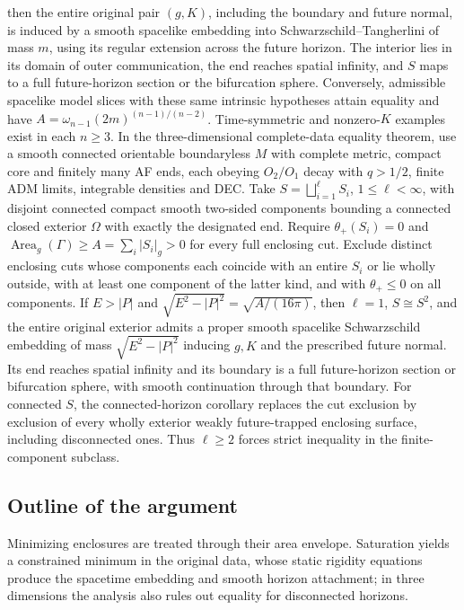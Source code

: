 \documentclass[11pt]{article}
\begin{document}
then the entire original pair $(g,K)$, including the boundary and future normal, is induced by a smooth spacelike embedding into Schwarzschild--Tangherlini of mass $m$, using its regular extension across the future horizon. The interior lies in its domain of outer communication, the end reaches spatial infinity, and $S$ maps to a full future-horizon section or the bifurcation sphere. Conversely, admissible spacelike model slices with these same intrinsic hypotheses attain equality and have $A=\omega_{n-1}(2m)^{(n-1)/(n-2)}$. Time-symmetric and nonzero-$K$ examples exist in each $n\ge3$. In the three-dimensional complete-data equality theorem, use a smooth connected orientable boundaryless $M$ with complete metric, compact core and finitely many AF ends, each obeying $O_2/O_1$ decay with $q>1/2$, finite ADM limits, integrable densities and DEC. Take $S=\bigsqcup_{i=1}^{\ell}S_i$, $1\le\ell<\infty$, with disjoint connected compact smooth two-sided components bounding a connected closed exterior $\Omega$ with exactly the designated end. Require $\theta_+(S_i)=0$ and $\operatorname{Area}_g(\Gamma)\ge A=\sum_i|S_i|_g>0$ for every full enclosing cut. Exclude distinct enclosing cuts whose components each coincide with an entire $S_i$ or lie wholly outside, with at least one component of the latter kind, and with $\theta_+\le0$ on all components. If $E>|P|$ and $\sqrt{E^2-|P|^2}=\sqrt{A/(16\pi)}$, then $\ell=1$, $S\cong S^2$, and the entire original exterior admits a proper smooth spacelike Schwarzschild embedding of mass $\sqrt{E^2-|P|^2}$ inducing $g,K$ and the prescribed future normal. Its end reaches spatial infinity and its boundary is a full future-horizon section or bifurcation sphere, with smooth continuation through that boundary. For connected $S$, the connected-horizon corollary replaces the cut exclusion by exclusion of every wholly exterior weakly future-trapped enclosing surface, including disconnected ones. Thus $\ell\ge2$ forces strict inequality in the finite-component subclass.

\subsection{Outline of the argument}
Minimizing enclosures are treated through their area envelope. Saturation yields a constrained minimum in the original data, whose static rigidity equations produce the spacetime embedding and smooth horizon attachment; in three dimensions the analysis also rules out equality for disconnected horizons.
\end{document}
